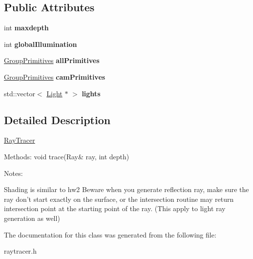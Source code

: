 \subsection*{Public Attributes}
\begin{DoxyCompactItemize}
\item 
\mbox{\label{class_ray_tracer_ac62edf1f171bf05ef134b2358736422e}} 
int {\bfseries maxdepth}
\item 
\mbox{\label{class_ray_tracer_af6369232f63621266929b4c3a9d62167}} 
int {\bfseries global\+Illumination}
\item 
\mbox{\label{class_ray_tracer_ae9c76596c32ae88fa768e998d10bdae7}} 
\mbox{\hyperlink{class_group_primitives}{Group\+Primitives}} {\bfseries all\+Primitives}
\item 
\mbox{\label{class_ray_tracer_a0ee8a7856ff835d6d30f3dbd8ab0aeb9}} 
\mbox{\hyperlink{class_group_primitives}{Group\+Primitives}} {\bfseries cam\+Primitives}
\item 
\mbox{\label{class_ray_tracer_a511758fa4a2091c0951614753a4dd958}} 
std\+::vector$<$ \mbox{\hyperlink{class_light}{Light}} $\ast$ $>$ {\bfseries lights}
\end{DoxyCompactItemize}


\subsection{Detailed Description}
\mbox{\hyperlink{class_ray_tracer}{Ray\+Tracer}}

Methods\+: void trace(\+Ray\& ray, int depth)

Notes\+:

Shading is similar to hw2 Beware when you generate reflection ray, make sure the ray don’t start exactly on the surface, or the intersection routine may return intersection point at the starting point of the ray. (This apply to light ray generation as well) 

The documentation for this class was generated from the following file\+:\begin{DoxyCompactItemize}
\item 
raytracer.\+h\end{DoxyCompactItemize}
